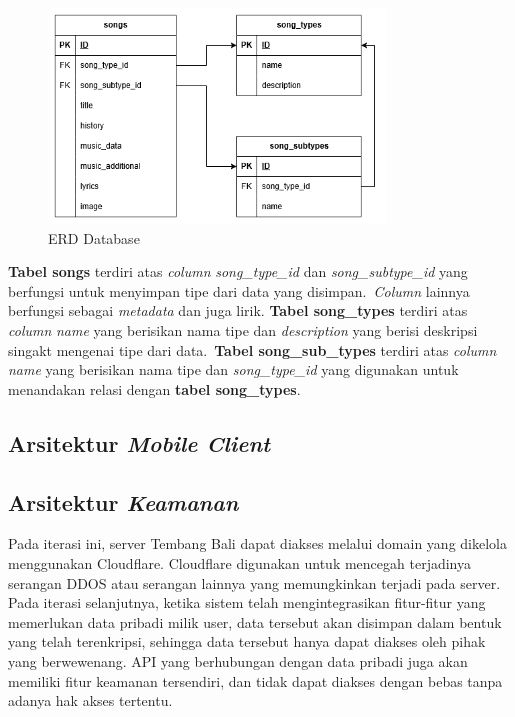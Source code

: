\begin{figure}[H]
    \centering
    \includegraphics[width=0.8\textwidth]{assets/erd.png}
    \caption{ERD Database}
\end{figure}

\textbf{Tabel songs} terdiri atas \textit{column} \textit{song\_type\_id} dan \textit{song\_subtype\_id} yang berfungsi untuk menyimpan tipe dari data yang disimpan.\
\textit{Column} lainnya berfungsi sebagai \textit{metadata} dan juga lirik.
\textbf{Tabel song\_types} terdiri atas \textit{column} \textit{name} yang berisikan nama tipe dan \textit{description} yang berisi deskripsi singakt mengenai tipe dari data.\
\textbf{Tabel song\_sub\_types} terdiri atas \textit{column} \textit{name} yang berisikan nama tipe dan \textit{song\_type\_id} yang digunakan untuk menandakan relasi dengan \textbf{tabel song\_types}.\

\subsection{Arsitektur \textit{Mobile Client}}

\subsection{Arsitektur \textit{Keamanan}}
Pada iterasi ini, server Tembang Bali dapat diakses melalui domain yang dikelola menggunakan Cloudflare. Cloudflare digunakan untuk mencegah terjadinya serangan DDOS atau serangan lainnya yang memungkinkan terjadi pada server.
Pada iterasi selanjutnya, ketika sistem telah mengintegrasikan fitur-fitur yang memerlukan data pribadi milik user, data tersebut akan disimpan dalam bentuk yang telah terenkripsi, sehingga data tersebut hanya dapat diakses oleh pihak yang berwewenang.
API yang berhubungan dengan data pribadi juga akan memiliki fitur keamanan tersendiri, dan tidak dapat diakses dengan bebas tanpa adanya hak akses tertentu.

